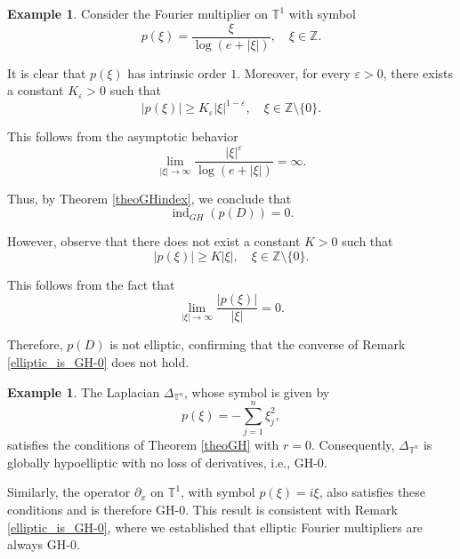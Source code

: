 \documentclass[11pt]{amsart}
\numberwithin{equation}{section}
\theoremstyle{definition}
\newtheorem{example}[theorem]{Example}
\begin{document}
	\begin{example}\label{example_log}
		Consider the Fourier multiplier on \( \mathbb{T}^1 \) with symbol  
		\[
		p(\xi) = \frac{\xi}{\log(e + |\xi|)}, \quad \xi \in \mathbb{Z}.
		\]
		
		It is clear that \( p(\xi) \) has intrinsic order \( 1 \). Moreover, for every \( \varepsilon > 0 \), there exists a constant \( K_{\varepsilon} > 0 \) such that  
		\begin{equation*}
			|p(\xi)| \geq K_{\varepsilon} |\xi|^{1 - \varepsilon}, \quad \xi \in \mathbb{Z} \setminus \{0\}.
		\end{equation*}
		
		This follows from the asymptotic behavior  
		\[
		\lim_{|\xi| \to \infty} \frac{|\xi|^{\varepsilon}}{\log(e + |\xi|)} = \infty.
		\]
		
		Thus, by Theorem \ref{theoGHindex}, we conclude that  
		\[
		\operatorname{ind}_{GH}(p(D)) = 0.
		\]
		
		
		However, observe that there does not exist a constant \( K > 0 \) such that  
		\begin{equation*}
			|p(\xi)| \geq K |\xi|, \quad \xi \in \mathbb{Z} \setminus \{0\}.
		\end{equation*}
		
		This follows from the fact that  
		\[
		\lim_{|\xi| \to \infty} \frac{|p(\xi)|}{|\xi|} = 0.
		\]
		
		Therefore, \( p(D) \) is not elliptic, confirming that the converse of Remark \ref{elliptic_is_GH-0} does not hold.
	\end{example}
	
	\begin{example}\label{Laplacian_GH-0}
		The Laplacian \( \Delta_{\mathbb{T}^n} \), whose symbol is given by 
		\[
		p(\xi) = -\sum_{j=1}^{n} \xi_j^2,
		\]
		satisfies the conditions of Theorem \ref{theoGH} with \( r = 0 \). Consequently, \( \Delta_{\mathbb{T}^n} \) is globally hypoelliptic with no loss of derivatives, i.e., GH-\( 0 \).
		
		Similarly, the operator \( \partial_x \) on \( \mathbb{T}^1 \), with symbol \( p(\xi) = i\xi \), also satisfies these conditions and is therefore GH-\( 0 \). This result is consistent with Remark \ref{elliptic_is_GH-0}, where we established that elliptic Fourier multipliers are always GH-\( 0 \).
	\end{example}
	
\end{document}
